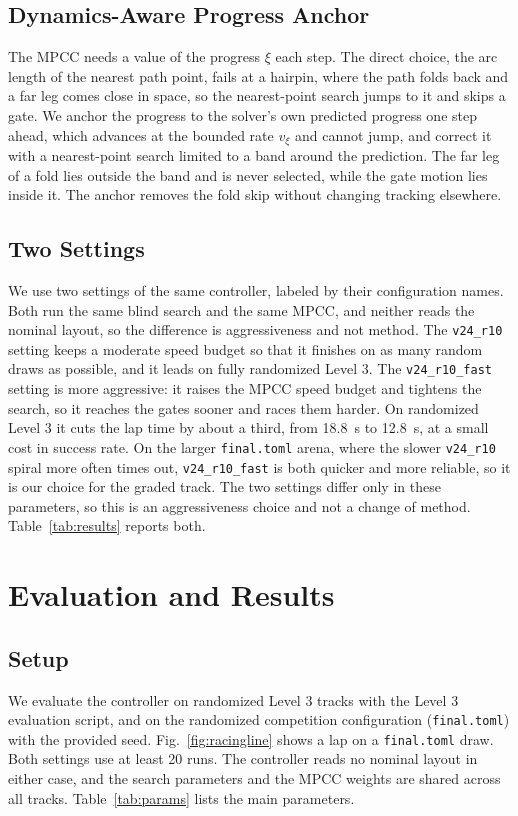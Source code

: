 \documentclass[conference]{IEEEtran}
\begin{document}
\subsection{Dynamics-Aware Progress Anchor}
\label{sec:anchor}
The MPCC needs a value of the progress $\xi$ each step. The direct choice, the arc length of the nearest path point, fails at a hairpin, where the path folds back and a far leg comes close in space, so the nearest-point search jumps to it and skips a gate. We anchor the progress to the solver's own predicted progress one step ahead, which advances at the bounded rate $v_\xi$ and cannot jump, and correct it with a nearest-point search limited to a band around the prediction. The far leg of a fold lies outside the band and is never selected, while the gate motion lies inside it. The anchor removes the fold skip without changing tracking elsewhere.

\subsection{Two Settings}
\label{sec:settings}
We use two settings of the same controller, labeled by their configuration names. Both run the same blind search and the same MPCC, and neither reads the nominal layout, so the difference is aggressiveness and not method. The \texttt{v24\_r10} setting keeps a moderate speed budget so that it finishes on as many random draws as possible, and it leads on fully randomized Level 3. The \texttt{v24\_r10\_fast} setting is more aggressive: it raises the MPCC speed budget and tightens the search, so it reaches the gates sooner and races them harder. On randomized Level 3 it cuts the lap time by about a third, from 18.8~s to 12.8~s, at a small cost in success rate. On the larger \texttt{final.toml} arena, where the slower \texttt{v24\_r10} spiral more often times out, \texttt{v24\_r10\_fast} is both quicker and more reliable, so it is our choice for the graded track. The two settings differ only in these parameters, so this is an aggressiveness choice and not a change of method. Table~\ref{tab:results} reports both.

\section{Evaluation and Results}
\label{sec:results}

\subsection{Setup}
We evaluate the controller on randomized Level 3 tracks with the Level 3 evaluation script, and on the randomized competition configuration (\texttt{final.toml}) with the provided seed. Fig.~\ref{fig:racingline} shows a lap on a \texttt{final.toml} draw. Both settings use at least 20 runs. The controller reads no nominal layout in either case, and the search parameters and the MPCC weights are shared across all tracks. Table~\ref{tab:params} lists the main parameters.
\end{document}
